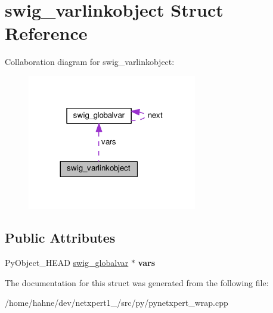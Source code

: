 \hypertarget{structswig__varlinkobject}{}\section{swig\+\_\+varlinkobject Struct Reference}
\label{structswig__varlinkobject}


Collaboration diagram for swig\+\_\+varlinkobject\+:\nopagebreak
\begin{figure}[H]
\begin{center}
\leavevmode
\includegraphics[width=209pt]{structswig__varlinkobject__coll__graph}
\end{center}
\end{figure}
\subsection*{Public Attributes}
\begin{DoxyCompactItemize}
\item 
Py\+Object\+\_\+\+H\+E\+AD \hyperlink{structswig__globalvar}{swig\+\_\+globalvar} $\ast$ {\bfseries vars}\hypertarget{structswig__varlinkobject_a8cf96d999cdf0b28a0e90ccb6804c9bd}{}\label{structswig__varlinkobject_a8cf96d999cdf0b28a0e90ccb6804c9bd}

\end{DoxyCompactItemize}


The documentation for this struct was generated from the following file\+:\begin{DoxyCompactItemize}
\item 
/home/hahne/dev/netxpert1\+\_/src/py/pynetxpert\+\_\+wrap.\+cpp\end{DoxyCompactItemize}
